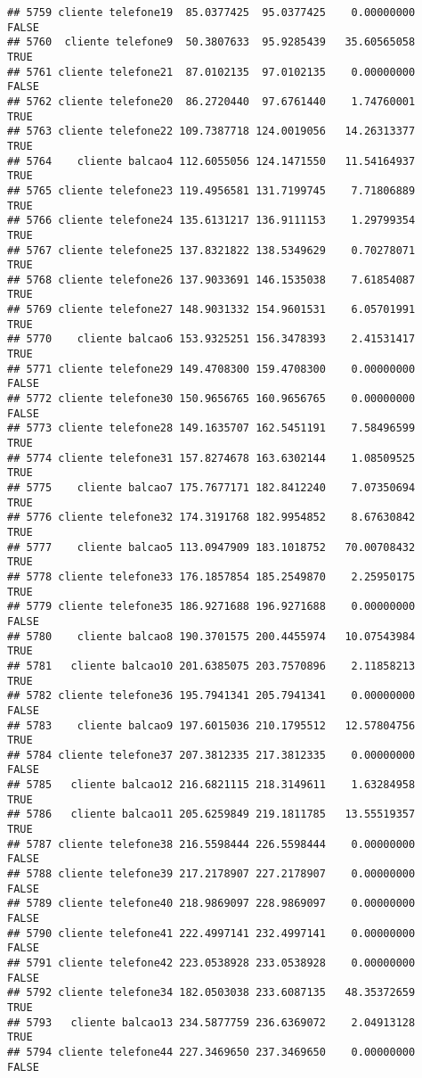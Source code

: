 \documentclass[
]{article}
\begin{document}
\begin{verbatim}
## 5759 cliente telefone19  85.0377425  95.0377425    0.00000000    FALSE
## 5760  cliente telefone9  50.3807633  95.9285439   35.60565058     TRUE
## 5761 cliente telefone21  87.0102135  97.0102135    0.00000000    FALSE
## 5762 cliente telefone20  86.2720440  97.6761440    1.74760001     TRUE
## 5763 cliente telefone22 109.7387718 124.0019056   14.26313377     TRUE
## 5764    cliente balcao4 112.6055056 124.1471550   11.54164937     TRUE
## 5765 cliente telefone23 119.4956581 131.7199745    7.71806889     TRUE
## 5766 cliente telefone24 135.6131217 136.9111153    1.29799354     TRUE
## 5767 cliente telefone25 137.8321822 138.5349629    0.70278071     TRUE
## 5768 cliente telefone26 137.9033691 146.1535038    7.61854087     TRUE
## 5769 cliente telefone27 148.9031332 154.9601531    6.05701991     TRUE
## 5770    cliente balcao6 153.9325251 156.3478393    2.41531417     TRUE
## 5771 cliente telefone29 149.4708300 159.4708300    0.00000000    FALSE
## 5772 cliente telefone30 150.9656765 160.9656765    0.00000000    FALSE
## 5773 cliente telefone28 149.1635707 162.5451191    7.58496599     TRUE
## 5774 cliente telefone31 157.8274678 163.6302144    1.08509525     TRUE
## 5775    cliente balcao7 175.7677171 182.8412240    7.07350694     TRUE
## 5776 cliente telefone32 174.3191768 182.9954852    8.67630842     TRUE
## 5777    cliente balcao5 113.0947909 183.1018752   70.00708432     TRUE
## 5778 cliente telefone33 176.1857854 185.2549870    2.25950175     TRUE
## 5779 cliente telefone35 186.9271688 196.9271688    0.00000000    FALSE
## 5780    cliente balcao8 190.3701575 200.4455974   10.07543984     TRUE
## 5781   cliente balcao10 201.6385075 203.7570896    2.11858213     TRUE
## 5782 cliente telefone36 195.7941341 205.7941341    0.00000000    FALSE
## 5783    cliente balcao9 197.6015036 210.1795512   12.57804756     TRUE
## 5784 cliente telefone37 207.3812335 217.3812335    0.00000000    FALSE
## 5785   cliente balcao12 216.6821115 218.3149611    1.63284958     TRUE
## 5786   cliente balcao11 205.6259849 219.1811785   13.55519357     TRUE
## 5787 cliente telefone38 216.5598444 226.5598444    0.00000000    FALSE
## 5788 cliente telefone39 217.2178907 227.2178907    0.00000000    FALSE
## 5789 cliente telefone40 218.9869097 228.9869097    0.00000000    FALSE
## 5790 cliente telefone41 222.4997141 232.4997141    0.00000000    FALSE
## 5791 cliente telefone42 223.0538928 233.0538928    0.00000000    FALSE
## 5792 cliente telefone34 182.0503038 233.6087135   48.35372659     TRUE
## 5793   cliente balcao13 234.5877759 236.6369072    2.04913128     TRUE
## 5794 cliente telefone44 227.3469650 237.3469650    0.00000000    FALSE

\end{verbatim}
\end{document}

